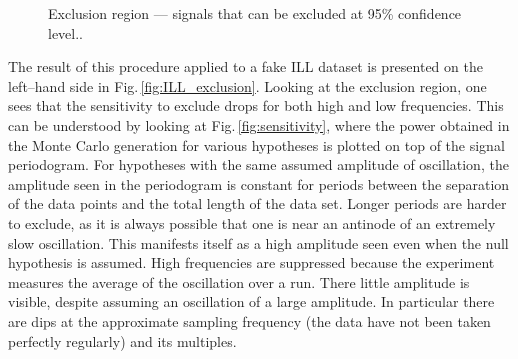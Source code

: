 \begin{figure}
  \myfloatalign
  \quad
  \caption{Exclusion region --- signals that can be excluded at 95\% confidence level..}
  \label{fig:axions_exclusions}
\end{figure}


The result of this procedure applied to a fake ILL dataset is presented on the left--hand side in Fig.\,\ref{fig:ILL_exclusion}. Looking at the exclusion region, one sees that the sensitivity to exclude drops for both high and low frequencies. This can be understood by looking at Fig.\,\ref{fig:sensitivity}, where the power obtained in the Monte Carlo generation for various hypotheses is plotted on top of the signal periodogram. For hypotheses with the same assumed amplitude of oscillation, the amplitude seen in the periodogram is constant for periods between the separation of the data points and the total length of the data set. Longer periods are harder to exclude, as it is always possible that one is near an antinode of an extremely slow oscillation. This manifests itself as a high amplitude seen even when the null hypothesis is assumed. High frequencies are suppressed because the experiment measures the average of the oscillation over a run. There little amplitude is visible, despite assuming an oscillation of a large amplitude. In particular there are dips at the approximate sampling frequency (the data have not been taken perfectly regularly) and its multiples.

